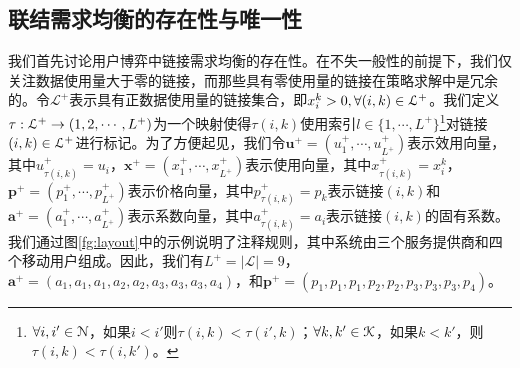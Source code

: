 \subsection{联结需求均衡的存在性与唯一性}
我们首先讨论用户博弈中链接需求均衡的存在性。在不失一般性的前提下，我们仅关注数据使用量大于零的链接，而那些具有零使用量的链接在策略求解中是冗余的。令$\mathcal{L}^{+}$表示具有正数据使用量的链接集合，即$x^{k}_{i}> 0,\forall(i,k)\in\mathcal{L }^{+}$。我们定义$\tau:\mathcal{L}^{+}\rightarrow(1,2,\cdots,L^+)$为一个映射使得$\tau(i,k)$使用索引$l\in\{1,\cdots,L^+\}$\footnote{$\forall i,i'\in\mathcal{N}$，如果$i<i'$则$\tau(i,k)<\tau(i',k)$；$\forall k,k'\in\mathcal{K}$，如果$k<k'$，则$\tau(i,k)<\tau(i,k')$。}对链接$(i,k)\in\mathcal{L}^{+}$进行标记。为了方便起见，我们令$\mathbf{u}^+ =(u^{+}_{1},\cdots,u^{+}_{L^{+}})$表示效用向量，其中$u^{+}_{\tau(i,k)} = u_{i}$，$\mathbf{x}^{+} =(x^{+}_{1}, \cdots, x^{+}_{L^{+}})$表示使用向量，其中$x^{+}_{\tau(i,k)} = x^{k}_{i}$，$\mathbf{p}^+=(p^{+}_{1}, \cdots, p^{+}_{L^{+}})$表示价格向量，其中$p_{\tau(i,k)}^+ = p_k$表示链接$(i,k)$和$\mathbf{a}^+ =(a^{+}_{1}, \cdots, a^{+}_{L^{+}})$表示系数向量，其中$a_{\tau(i,k)}^+ = a_i$表示链接$(i,k)$的固有系数。我们通过图\ref{fg:layout}中的示例说明了注释规则，其中系统由三个服务提供商和四个移动用户组成。因此，我们有$L^+= |\mathcal{L}| = 9$，$\mathbf{a}^+=(a_1,a_1,a_1,a_2,a_2,a_3,a_3,a_3,a_4)$，和$\mathbf{p}^+=(p_1,p_1,p_1,p_2,p_2,p_3,p_3,p_3,p_4)$。

